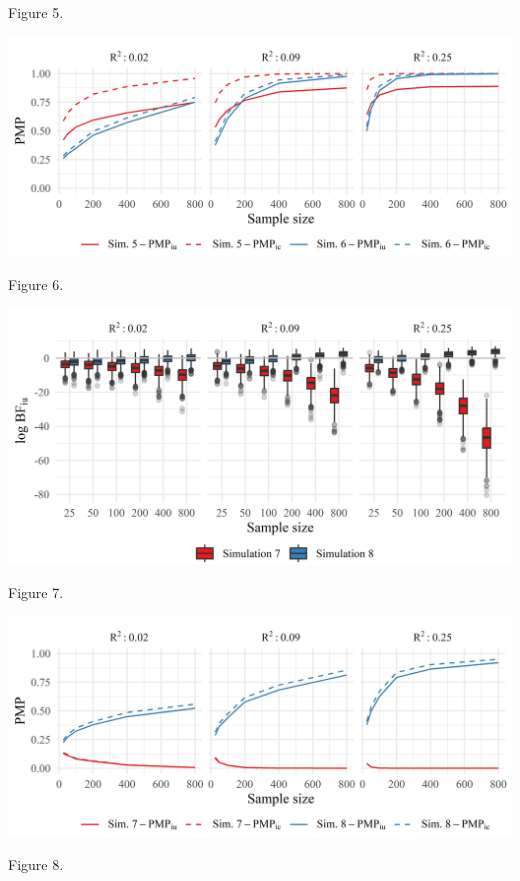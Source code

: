 \documentclass[
]{interact}
\begin{document}
Figure 5.

\includegraphics[width=1\textwidth,height=\textheight]{figures/figure-6.jpeg}

Figure 6.

\includegraphics[width=1\textwidth,height=\textheight]{figures/figure-7.jpeg}

Figure 7.

\includegraphics[width=1\textwidth,height=\textheight]{figures/figure-8.jpeg}

Figure 8.
\end{document}
